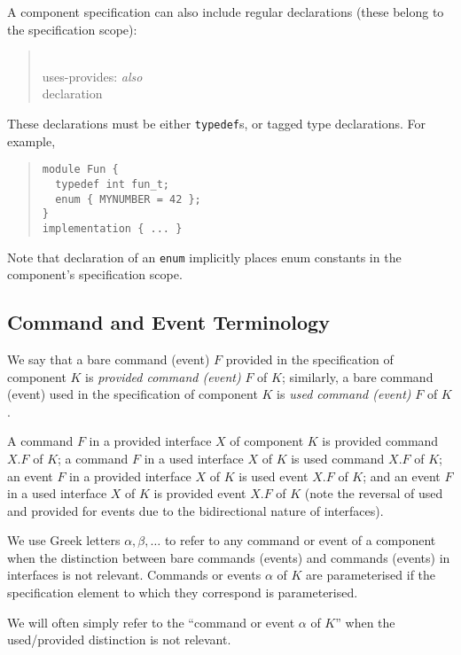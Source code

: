 \documentclass[11pt,letterpaper]{article}
\newcommand{\kw}[1]{{\tt #1}}
\newcommand{\grammarshift}{\vspace*{-.7cm}}
\newcommand{\grammarindent}{\hspace*{2cm}\= \\ \kill}
\begin{document}
A component specification can also include regular declarations (these
belong to the specification scope):
\begin{quote} \grammarshift \em \begin{tabbing}
\grammarindent
uses-provides: \emph{also}\\
\>	declaration\\
\end{tabbing} \end{quote}

These declarations must be either \kw{typedef}s, or tagged type
declarations. For example,
\begin{quote} \begin{verbatim}
module Fun {
  typedef int fun_t;
  enum { MYNUMBER = 42 };
}
implementation { ... }
\end{verbatim}
\end{quote}

Note that declaration of an \kw{enum} implicitly places enum constants
in the component's specification scope.


\subsection{Command and Event Terminology}

We say that a bare command (event) $F$ provided in the specification of
component $K$ is \emph{provided command (event)} $F$ of $K$; similarly, a
bare command (event) used in the specification of component $K$ is
\emph{used command (event)} $F$ of $K$.

A command $F$ in a provided interface $X$ of component $K$ is
provided command $X.F$ of $K$; a command $F$ in a used interface
$X$ of $K$ is used command $X.F$ of $K$; an event $F$ in a provided
interface $X$ of $K$ is used event $X.F$ of $K$; and an event $F$
in a used interface $X$ of $K$ is provided event $X.F$ of $K$
(note the reversal of used and provided for events due to the bidirectional
nature of interfaces). 

We use Greek letters $\alpha, \beta, \ldots$ to refer to any command or
event of a component when the distinction between bare commands (events)
and commands (events) in interfaces is not relevant. Commands or events
$\alpha$ of $K$ are parameterised if the specification element to which they
correspond is parameterised.

We will often simply refer to the ``command or event $\alpha$ of $K$'' when
the used/provided distinction is not relevant.
\end{document}
